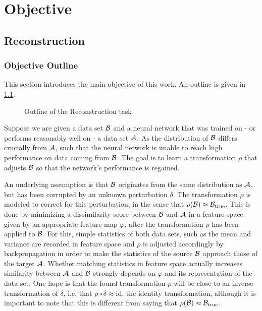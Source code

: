 \chapter{Objective}
\label{chap:Objective}





\section{Reconstruction}
\label{sec:Reconstruction}

\subsection{Objective Outline}
This section introduces the main objective of this work. An outline is given in \cref{fig:outline}.
\begin{figure}[h]
    \centering
    
    \caption{Outline of the Reconstruction task}
    \label{fig:outline}
    \centering
\end{figure}


Suppose we are given a data set $\mathcal B$ 
and a neural network that was trained on - or performs reasonably well on - a data set $\mathcal A$.
As the distribution of $\mathcal B$ differs crucially from $\mathcal A$, 
such that the neural network is unable to reach high performance on data coming from $\mathcal B$.
The goal is to learn a transformation $\rho$ that adjusts $\mathcal B$ 
so that the network's performance is regained.

An underlying assumption is that $\mathcal B$ originates from the same distribution
as $\mathcal A$, but has been corrupted by an unknown perturbation $\delta$.
The transformation $\rho$ is modeled to correct for this perturbation, 
in the sense that $\rho(\mathcal B) \approx \mathcal B_\text{true}$.
This is done by minimizing a dissimilarity-score between $\mathcal B$ and $\mathcal A$ 
in a feature space given by an appropriate feature-map $\varphi$, 
after the transformation $\rho$ has been applied to $\mathcal B$.
For this, simple statistics of both data sets, such as the mean and variance 
are recorded in feature space and $\rho$ is adjusted accordingly by backpropagation 
in order to make the statistics of the source $\mathcal B$ approach those of the target $\mathcal A$.
%
Whether matching statistics in feature space actually increases similarity between $\mathcal A$ and $\mathcal B$
strongly depends on $\varphi$ and its representation of the data set.
%
One hope is that the found transformation $\rho$ will be close to an inverse transformation
of $\delta$, i.e. that $\rho\circ\delta \approx \text{id}$, the identity transformation,
although it is important to note that this is different from saying that $\rho(\mathcal B) \approx \mathcal B_\text{true}$.


